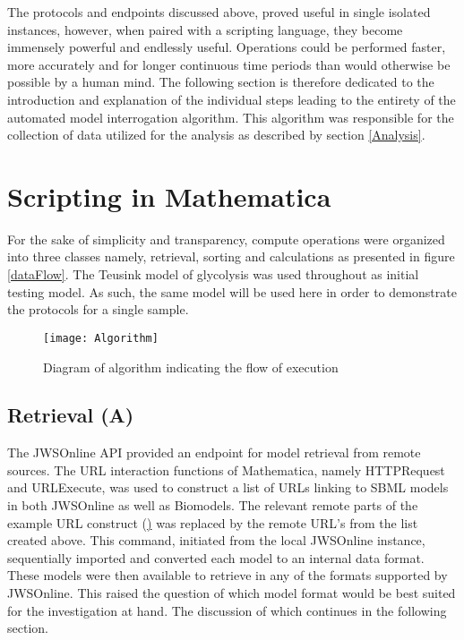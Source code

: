 The protocols and endpoints discussed above, proved useful in single isolated instances, however, when paired with a scripting language, they become immensely powerful and endlessly useful. Operations could be performed faster, more accurately and for longer continuous time periods than would otherwise be possible by a human mind. The following section is therefore dedicated to the introduction and explanation of the individual steps leading to the entirety of the automated model interrogation algorithm. This algorithm was responsible for the collection of data utilized for the analysis as described by section \ref{Analysis}.

\section{Scripting in Mathematica} \label{Scripting in Mathematica}

For the sake of simplicity and transparency, compute operations were organized into three classes namely, retrieval, sorting and calculations as presented in figure \ref{dataFlow}. The Teusink model of glycolysis was used throughout as initial testing model. As such, the same model will be used here in order to demonstrate the protocols for a single sample. 

\begin{figure}[p] \label{dataFlow}
\texttt{[image: Algorithm]}
\centering
\caption{Diagram of algorithm indicating the flow of execution}
\label{fig:Algorithm}
\end{figure}

\subsection{Retrieval (A)} \label{Retrieval}
The JWSOnline API provided an endpoint for model retrieval from remote sources. The URL interaction functions of Mathematica, namely HTTPRequest and URLExecute, was used to construct a list of URLs linking to SBML models in both JWSOnline as well as Biomodels. The relevant remote parts of the example URL construct (\href{http://jjj.bio.vu.nl/rest/fetch/?type={type}&redirect={redirect}&remote={remote}}) was replaced by the remote URL's from the list created above. This command, initiated from the local JWSOnline instance, sequentially imported and converted each model to an internal data format. These models were then available to retrieve in any of the formats supported by JWSOnline. This raised the question of which model format would be best suited for the investigation at hand. The discussion of which continues in the following section.

